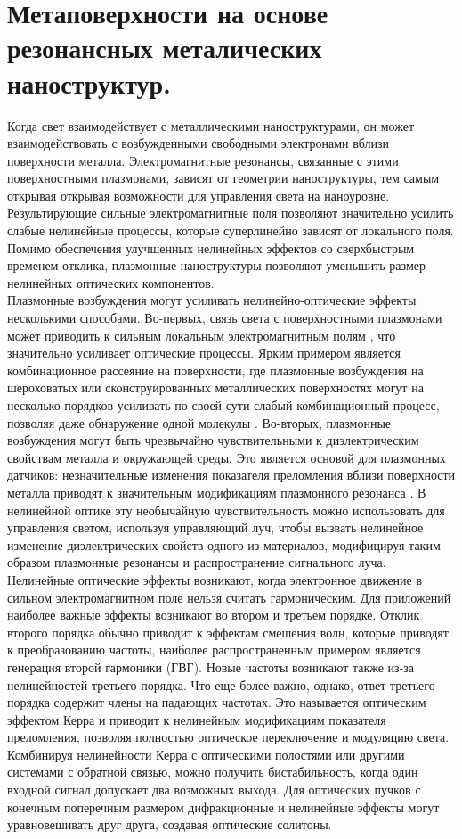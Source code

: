 \section{Метаповерхности на основе резонансных металических наноструктур.}
\hspace*{2mm}
Когда свет взаимодействует с металлическими наноструктурами, он может взаимодействовать с возбужденными свободными электронами вблизи поверхности металла. Электромагнитные резонансы, связанные с этими поверхностными плазмонами, зависят от геометрии наноструктуры, тем самым открывая открывая возможности для управления света на наноуровне. Результирующие сильные электромагнитные поля позволяют значительно усилить слабые нелинейные процессы, которые суперлинейно зависят от локального поля. Помимо обеспечения улучшенных нелинейных эффектов со сверхбыстрым временем отклика, плазмонные наноструктуры позволяют уменьшить размер нелинейных оптических компонентов.
\\
\hspace*{2mm}
Плазмонные возбуждения могут усиливать нелинейно-оптические эффекты несколькими способами. 
Во-первых, связь света с поверхностными плазмонами может приводить к сильным локальным электромагнитным полям \cite{novotny2011antennas}, что значительно усиливает оптические процессы. Ярким примером является комбинационное рассеяние на поверхности, где плазмонные возбуждения на шероховатых или сконструированных металлических поверхностях могут на несколько порядков усиливать по своей сути слабый комбинационный процесс, позволяя даже обнаружение одной молекулы \cite{sharma2012sers}.
Во-вторых, плазмонные возбуждения могут быть чрезвычайно чувствительными к диэлектрическим свойствам металла и окружающей среды. Это является основой для плазмонных датчиков: незначительные изменения показателя преломления вблизи поверхности металла приводят к значительным модификациям плазмонного резонанса \cite{homola2008surface}. В нелинейной оптике эту необычайную чувствительность можно использовать для управления светом, используя управляющий луч, чтобы вызвать нелинейное изменение диэлектрических свойств одного из материалов, модифицируя таким образом плазмонные резонансы и распространение сигнального луча.
\\
\hspace*{2mm}
Нелинейные оптические эффекты возникают, когда электронное движение в сильном электромагнитном поле нельзя считать гармоническим.   Для приложений наиболее важные эффекты возникают во втором и третьем порядке. Отклик второго порядка обычно приводит к эффектам смешения волн, которые приводят к преобразованию частоты, наиболее распространенным примером является генерация второй гармоники (ГВГ). Новые частоты возникают также из-за нелинейностей третьего порядка. Что еще более важно, однако, ответ третьего порядка содержит члены на падающих частотах. Это называется оптическим эффектом Керра и приводит к нелинейным модификациям показателя преломления, позволяя полностью оптическое переключение и модуляцию света. Комбинируя нелинейности Керра с оптическими полостями или другими системами с обратной связью, можно получить бистабильность, когда один входной сигнал допускает два возможных выхода. Для оптических пучков с конечным поперечным размером дифракционные и нелинейные эффекты могут уравновешивать друг друга, создавая оптические солитоны.
